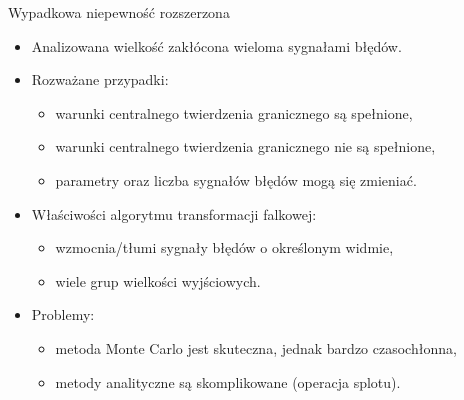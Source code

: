 \documentclass[12pt, polish, aspectratio = 169]{slides}
\begin{document}
\begin{frame}{Wypadkowa niepewność rozszerzona}
\begin{itemize}
\item Analizowana wielkość zakłócona wieloma sygnałami błędów.
\item Rozważane przypadki:
	\begin{itemize}
	\item warunki centralnego twierdzenia granicznego są spełnione,
	\item warunki centralnego twierdzenia granicznego nie są spełnione,
	\item parametry oraz liczba sygnałów błędów mogą się zmieniać.
	\end{itemize}
\item Właściwości algorytmu transformacji falkowej:
	\begin{itemize}
	\item wzmocnia/tłumi sygnały błędów o określonym widmie,
	\item wiele grup wielkości wyjściowych.
	\end{itemize}
\item Problemy:
	\begin{itemize}
	\item metoda Monte Carlo jest skuteczna, jednak bardzo czasochłonna,
	\item metody analityczne są skomplikowane (operacja splotu).
	\end{itemize}
\end{itemize}
\end{frame}
\end{document}
